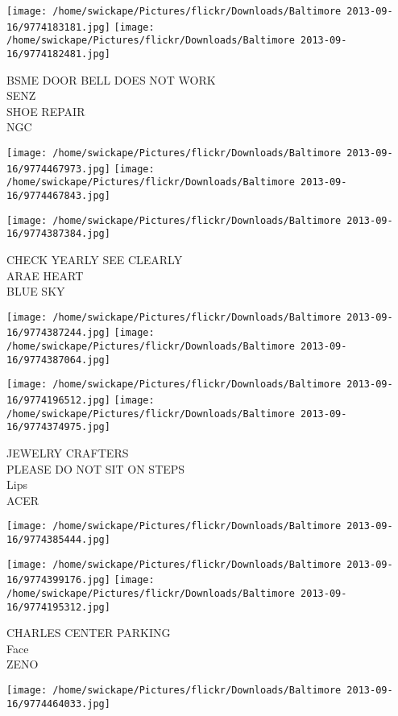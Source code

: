 \documentclass[10pt,letterpaper]{article}
\begin{document}
\texttt{[image: /home/swickape/Pictures/flickr/Downloads/Baltimore 2013-09-16/9774183181.jpg]}
\texttt{[image: /home/swickape/Pictures/flickr/Downloads/Baltimore 2013-09-16/9774182481.jpg]}

BSME DOOR BELL DOES NOT WORK\\
SENZ\\
SHOE REPAIR\\
NGC
\pagebreak

\texttt{[image: /home/swickape/Pictures/flickr/Downloads/Baltimore 2013-09-16/9774467973.jpg]}
\texttt{[image: /home/swickape/Pictures/flickr/Downloads/Baltimore 2013-09-16/9774467843.jpg]}

\vspace{0.25in}
\texttt{[image: /home/swickape/Pictures/flickr/Downloads/Baltimore 2013-09-16/9774387384.jpg]}

CHECK YEARLY SEE CLEARLY\\
ARAE HEART\\
BLUE SKY
\pagebreak

\texttt{[image: /home/swickape/Pictures/flickr/Downloads/Baltimore 2013-09-16/9774387244.jpg]}
\texttt{[image: /home/swickape/Pictures/flickr/Downloads/Baltimore 2013-09-16/9774387064.jpg]}

\texttt{[image: /home/swickape/Pictures/flickr/Downloads/Baltimore 2013-09-16/9774196512.jpg]}
\texttt{[image: /home/swickape/Pictures/flickr/Downloads/Baltimore 2013-09-16/9774374975.jpg]}

JEWELRY CRAFTERS\\
PLEASE DO NOT SIT ON STEPS\\
Lips\\
ACER
\pagebreak

\texttt{[image: /home/swickape/Pictures/flickr/Downloads/Baltimore 2013-09-16/9774385444.jpg]}

\vspace{0.25in}
\texttt{[image: /home/swickape/Pictures/flickr/Downloads/Baltimore 2013-09-16/9774399176.jpg]}
\texttt{[image: /home/swickape/Pictures/flickr/Downloads/Baltimore 2013-09-16/9774195312.jpg]}

CHARLES CENTER PARKING\\
Face\\
ZENO
\pagebreak

\texttt{[image: /home/swickape/Pictures/flickr/Downloads/Baltimore 2013-09-16/9774464033.jpg]}
\end{document}
